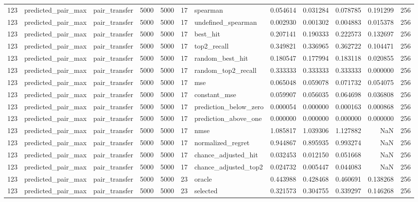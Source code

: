 \begin{tabular}{rllrrrlrrrrr}
123 & predicted_pair_max & pair_transfer & 5000 & 5000 & 17 & spearman & 0.054614 & 0.031284 & 0.078785 & 0.191299 & 256 \\
123 & predicted_pair_max & pair_transfer & 5000 & 5000 & 17 & undefined_spearman & 0.002930 & 0.001302 & 0.004883 & 0.015378 & 256 \\
123 & predicted_pair_max & pair_transfer & 5000 & 5000 & 17 & best_hit & 0.207141 & 0.190333 & 0.222573 & 0.132697 & 256 \\
123 & predicted_pair_max & pair_transfer & 5000 & 5000 & 17 & top2_recall & 0.349821 & 0.336965 & 0.362722 & 0.104471 & 256 \\
123 & predicted_pair_max & pair_transfer & 5000 & 5000 & 17 & random_best_hit & 0.180547 & 0.177994 & 0.183118 & 0.020855 & 256 \\
123 & predicted_pair_max & pair_transfer & 5000 & 5000 & 17 & random_top2_recall & 0.333333 & 0.333333 & 0.333333 & 0.000000 & 256 \\
123 & predicted_pair_max & pair_transfer & 5000 & 5000 & 17 & mse & 0.065048 & 0.059078 & 0.071732 & 0.054075 & 256 \\
123 & predicted_pair_max & pair_transfer & 5000 & 5000 & 17 & constant_mse & 0.059907 & 0.056035 & 0.064698 & 0.036808 & 256 \\
123 & predicted_pair_max & pair_transfer & 5000 & 5000 & 17 & prediction_below_zero & 0.000054 & 0.000000 & 0.000163 & 0.000868 & 256 \\
123 & predicted_pair_max & pair_transfer & 5000 & 5000 & 17 & prediction_above_one & 0.000000 & 0.000000 & 0.000000 & 0.000000 & 256 \\
123 & predicted_pair_max & pair_transfer & 5000 & 5000 & 17 & nmse & 1.085817 & 1.039306 & 1.127882 & NaN & 256 \\
123 & predicted_pair_max & pair_transfer & 5000 & 5000 & 17 & normalized_regret & 0.944867 & 0.895935 & 0.993274 & NaN & 256 \\
123 & predicted_pair_max & pair_transfer & 5000 & 5000 & 17 & chance_adjusted_hit & 0.032453 & 0.012150 & 0.051668 & NaN & 256 \\
123 & predicted_pair_max & pair_transfer & 5000 & 5000 & 17 & chance_adjusted_top2 & 0.024732 & 0.005447 & 0.044083 & NaN & 256 \\
123 & predicted_pair_max & pair_transfer & 5000 & 5000 & 23 & oracle & 0.443988 & 0.428468 & 0.460691 & 0.138268 & 256 \\
123 & predicted_pair_max & pair_transfer & 5000 & 5000 & 23 & selected & 0.321573 & 0.304755 & 0.339297 & 0.146268 & 256 \\

\end{tabular}
